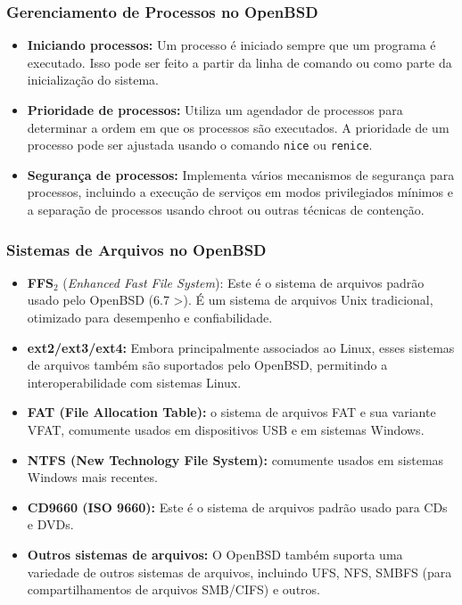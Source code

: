 \documentclass[9pt,xcolor=table]{beamer}
\begin{document}
\begin{frame}[fragile]
\frametitle{Gerenciamento de Processos no OpenBSD}
\justifying
\begin{itemize}
\item \textbf{Iniciando processos:} Um processo é iniciado sempre que um programa é executado. Isso pode ser feito a partir da linha de comando ou como parte da inicialização do sistema.

\item \textbf{Prioridade de processos:} Utiliza um agendador de processos para determinar a ordem em que os processos são executados. A prioridade de um processo pode ser ajustada usando o comando \verb|nice| ou \verb|renice|.

\item \textbf{Segurança de processos:} Implementa vários mecanismos de segurança para processos, incluindo a execução de serviços em modos privilegiados mínimos e a separação de processos usando chroot ou outras técnicas de contenção.
\end{itemize}
\end{frame}
\begin{frame}
\frametitle{Sistemas de Arquivos no OpenBSD}

\begin{itemize}
\item \textbf{FFS}$_{2}$ (\textit{Enhanced Fast File System}): Este é o sistema de arquivos padrão usado pelo OpenBSD (6.7 >). É um sistema de arquivos Unix tradicional, otimizado para desempenho e confiabilidade.

\item \textbf{ext2/ext3/ext4:} Embora principalmente associados ao Linux, esses sistemas de arquivos também são suportados pelo OpenBSD, permitindo a interoperabilidade com sistemas Linux.

\item \textbf{FAT (File Allocation Table):} o sistema de arquivos FAT e sua variante VFAT, comumente usados em dispositivos USB e em sistemas Windows.

\item \textbf{NTFS (New Technology File System):} comumente usados em sistemas Windows mais recentes.

\item \textbf{CD9660 (ISO 9660):} Este é o sistema de arquivos padrão usado para CDs e DVDs.

\item \textbf{Outros sistemas de arquivos:} O OpenBSD também suporta uma variedade de outros sistemas de arquivos, incluindo UFS, NFS, SMBFS (para compartilhamentos de arquivos SMB/CIFS) e outros.
\end{itemize}
\end{frame}
\end{document}
